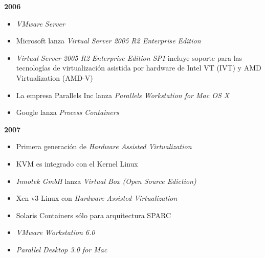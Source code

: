 \textbf{2006}
\begin{itemize}
	\item \textit{VMware Server} \\
	
	\item Microsoft lanza \textit{Virtual Server 2005 R2 Enterprise Edition}\\
	
	\item \textit{Virtual Server 2005 R2 Enterprise Edition SP1} incluye soporte para las tecnologías de virtualización asistida por hardware de Intel VT (IVT) y AMD Virtualization (AMD-V)\\
	
	\item La empresa Parallels Inc lanza \textit{Parallels Workstation for Mac OS X}\\
	
	\item Google lanza \textit{Process Containers} \\
	
\end{itemize}
	
\textbf{2007}\\
\begin{itemize}
	\item Primera generación de \textit{Hardware Assisted Virtualization}\\
	
	\item KVM es integrado con el Kernel Linux\\
	
	\item \textit{Innotek GmbH } lanza \textit{Virtual Box (Open Source Ediction)}\\
	
	\item Xen v3 Linux con  \textit{Hardware Assisted Virtualization}\\
	
	\item Solaris Containers sólo para arquitectura SPARC\\
	
	\item \textit{VMware Workstation 6.0}\\
	
	\item \textit{Parallel Desktop 3.0 for Mac}\\
\end{itemize}
			
